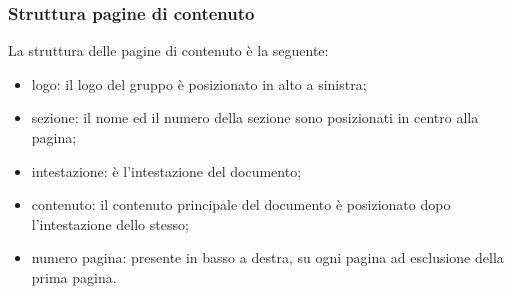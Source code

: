 \subsubsection{Struttura pagine di contenuto}
La struttura delle pagine di contenuto è la seguente:
\begin{itemize}
	\item logo: il logo del gruppo è posizionato in alto a sinistra;
	\item sezione: il nome ed il numero della sezione sono posizionati in centro alla pagina;
	\item intestazione: è l’intestazione del documento;
	\item contenuto: il contenuto principale del documento è posizionato dopo l’intestazione dello stesso;
	\item numero pagina: presente in basso a destra, su ogni pagina ad esclusione della prima pagina.
\end{itemize}



